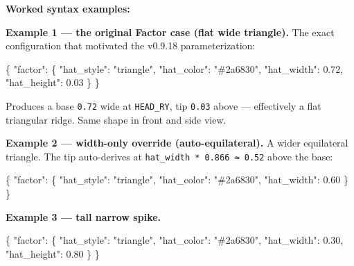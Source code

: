 \documentclass[
  12pt,
  letterpaper,
]{book}
\newenvironment{Shaded}{}{}
\newcommand{\DataTypeTok}[1]{\textcolor[rgb]{0.56,0.13,0.00}{#1}}
\newcommand{\FloatTok}[1]{\textcolor[rgb]{0.25,0.63,0.44}{#1}}
\newcommand{\FunctionTok}[1]{\textcolor[rgb]{0.02,0.16,0.49}{#1}}
\newcommand{\StringTok}[1]{\textcolor[rgb]{0.25,0.44,0.63}{#1}}
\begin{document}
\textbf{Worked syntax examples:}

\textbf{Example 1 --- the original Factor case (flat wide
triangle).} The exact configuration that motivated the v0.9.18
parameterization:

\begin{Shaded}
\begin{Highlighting}[]
\FunctionTok{\{}
  \DataTypeTok{"factor"}\FunctionTok{:} \FunctionTok{\{}
    \DataTypeTok{"hat\_style"}\FunctionTok{:}  \StringTok{"triangle"}\FunctionTok{,}
    \DataTypeTok{"hat\_color"}\FunctionTok{:}  \StringTok{"\#2a6830"}\FunctionTok{,}
    \DataTypeTok{"hat\_width"}\FunctionTok{:}  \FloatTok{0.72}\FunctionTok{,}
    \DataTypeTok{"hat\_height"}\FunctionTok{:} \FloatTok{0.03}
  \FunctionTok{\}}
\FunctionTok{\}}
\end{Highlighting}
\end{Shaded}

Produces a base \texttt{0.72} wide at \texttt{HEAD\_RY}, tip
\texttt{0.03} above --- effectively a flat triangular ridge. Same shape
in front and side view.

\textbf{Example 2 --- width-only override (auto-equilateral).} A
wider equilateral triangle. The tip auto-derives at
\texttt{hat\_width\ *\ 0.866\ ≈\ 0.52} above the base:

\begin{Shaded}
\begin{Highlighting}[]
\FunctionTok{\{}
  \DataTypeTok{"factor"}\FunctionTok{:} \FunctionTok{\{}
    \DataTypeTok{"hat\_style"}\FunctionTok{:}  \StringTok{"triangle"}\FunctionTok{,}
    \DataTypeTok{"hat\_color"}\FunctionTok{:}  \StringTok{"\#2a6830"}\FunctionTok{,}
    \DataTypeTok{"hat\_width"}\FunctionTok{:}  \FloatTok{0.60}
  \FunctionTok{\}}
\FunctionTok{\}}
\end{Highlighting}
\end{Shaded}

\textbf{Example 3 --- tall narrow spike.}

\begin{Shaded}
\begin{Highlighting}[]
\FunctionTok{\{}
  \DataTypeTok{"factor"}\FunctionTok{:} \FunctionTok{\{}
    \DataTypeTok{"hat\_style"}\FunctionTok{:}  \StringTok{"triangle"}\FunctionTok{,}
    \DataTypeTok{"hat\_color"}\FunctionTok{:}  \StringTok{"\#2a6830"}\FunctionTok{,}
    \DataTypeTok{"hat\_width"}\FunctionTok{:}  \FloatTok{0.30}\FunctionTok{,}
    \DataTypeTok{"hat\_height"}\FunctionTok{:} \FloatTok{0.80}
  \FunctionTok{\}}
\FunctionTok{\}}
\end{Highlighting}
\end{Shaded}
\end{document}
